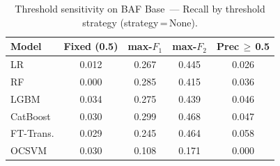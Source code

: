 \begin{table}[H]
\centering
\caption{Threshold sensitivity on BAF Base~--- Recall by threshold strategy (strategy\,=\,None).}
\label{tab:threshold_baf_recall}
\begin{tabular}{l c c c c}
\toprule
Model & Fixed (0.5) & max-$F_1$ & max-$F_2$ & Prec\,$\geq$\,0.5 \\
\midrule
LR         & 0.012 & 0.267 & 0.445 & 0.026 \\
RF         & 0.000 & 0.285 & 0.415 & 0.036 \\
LGBM       & 0.034 & 0.275 & 0.439 & 0.046 \\
CatBoost   & 0.030 & 0.299 & 0.468 & 0.047 \\
FT-Trans.  & 0.029 & 0.245 & 0.464 & 0.058 \\
OCSVM      & 0.030 & 0.108 & 0.171 & 0.000 \\
\bottomrule
\end{tabular}
\end{table}